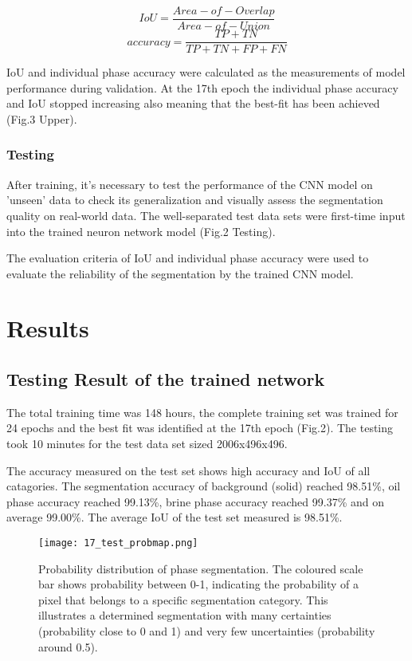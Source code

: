 \documentclass[draft,linenumbers]{agujournal2018}
\begin{document}
\begin{equation}
    IoU=\frac{Area-of-Overlap}{Area-of-Union}
\end{equation}
\begin{equation}
    accuracy=\frac{TP+TN}{TP+TN+FP+FN}
\end{equation}

IoU and individual phase accuracy were calculated as the measurements of model performance during validation. At the 17th epoch the individual phase accuracy and IoU stopped increasing also meaning that the best-fit has been achieved (Fig.3 Upper).

\subsubsection{Testing}
After training, it's necessary to test the performance of the CNN model on 'unseen' data to check its generalization and visually assess the segmentation quality on real-world data. The well-separated test data sets were first-time input into the trained neuron network model (Fig.2 Testing). 

The evaluation criteria of IoU and individual phase accuracy were used to evaluate the reliability of the segmentation by the trained CNN model.

\section{Results}
\subsection{Testing Result of the trained network}

The total training time was 148 hours, the complete training set was trained for 24 epochs and the best fit was identified at the 17th epoch (Fig.2). The testing took 10 minutes for the test data set sized 2006x496x496.

The accuracy measured on the test set shows high accuracy and IoU of all catagories. The segmentation accuracy of background (solid) reached 98.51\%, oil phase accuracy reached 99.13\%, brine phase accuracy reached 99.37\% and on average 99.00\%.
The average IoU of the test set measured is 98.51\%.

\begin{figure}[h]
 \centering
 \texttt{[image: 17\_test\_probmap.png]}
 \caption{Probability distribution of phase segmentation. The coloured scale bar shows probability between 0-1, indicating the probability of a pixel that belongs to a specific segmentation category. This illustrates a determined segmentation with many certainties (probability close to 0 and 1) and very few uncertainties (probability around 0.5).}
 \label{fig3}
 \end{figure}
 
\end{document}
